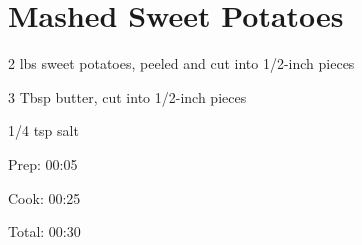 \documentclass[oneside]{book}  %
\def\thisrecipe{}  %
\newcommand{\recipe}[1]{\section{#1}\def\thisrecipe{: #1}} %
\begin{document}






\recipe{Mashed Sweet Potatoes} \label{recipe:mashed_sweet_potatoes} %

\begin{IT}
  \begin{ingredients}
    \item[2 lbs] sweet potatoes, peeled and cut into 1/2-inch pieces
    \item[3 Tbsp] butter, cut into 1/2-inch pieces
    \item[1/4 tsp] salt
  \end{ingredients}

  \switchcolumn

  \begin{timeline}
    \item[Prep:]  00:05
    \item[Cook:]  00:25
    \item[Total:] 00:30
  \end{timeline}
\end{IT}
\end{document}
